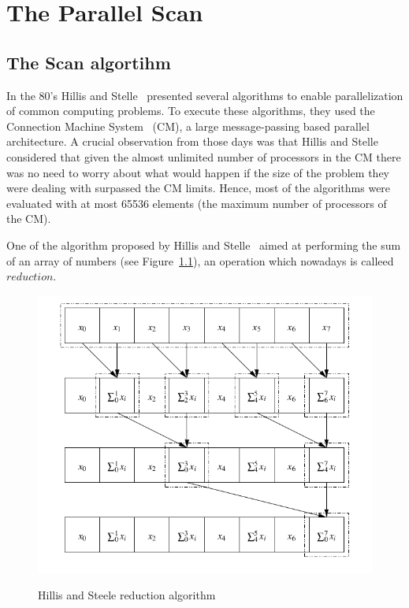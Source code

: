 \documentclass[Ingles]{ic-tese-v1}
\newcommand{\rfig}[1]{Figure~\ref{fig:#1}}
\begin{document}
\chapter{The Parallel Scan}
\label{cap:Scan}

\section{The Scan algortihm}
\label{sec:ScanAlg}

In the 80's Hillis and Stelle~\cite{dataparallel} presented several algorithms to enable parallelization of common computing problems. To execute these algorithms, they used the Connection Machine System~\cite{themachine} (CM), a large message-passing  based parallel architecture. A crucial observation from those days was that Hillis and Stelle considered that given the almost unlimited number of processors in the CM  there was no need to worry about what would happen if the size of the problem they were dealing with surpassed the CM limits. Hence, most of the algorithms were evaluated  with at most 65536 elements (the maximum number of processors of the CM).

One of the algorithm proposed by Hillis and Stelle~\cite{dataparallel} aimed at  performing the sum of an array of numbers (see \rfig{reductionhillis}), an operation which nowadays is calleed  $reduction$.

\begin{figure}[h]
	\centering
	\caption{Hillis and Steele reduction algorithm}
	\includegraphics[scale=0.5]{images/reduction.png}
	\label{fig:reductionhillis}
\end{figure}
\end{document}
